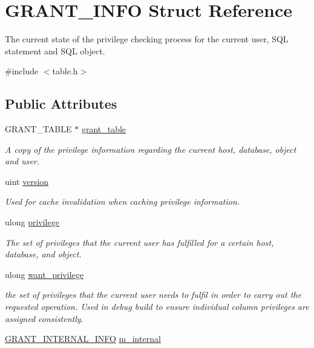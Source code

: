 \hypertarget{structGRANT__INFO}{}\section{G\+R\+A\+N\+T\+\_\+\+I\+N\+FO Struct Reference}
\label{structGRANT__INFO}


The current state of the privilege checking process for the current user, S\+QL statement and S\+QL object.  




{\ttfamily \#include $<$table.\+h$>$}

\subsection*{Public Attributes}
\begin{DoxyCompactItemize}
\item 
G\+R\+A\+N\+T\+\_\+\+T\+A\+B\+LE $\ast$ \mbox{\hyperlink{structGRANT__INFO_a25c6b4e6dd4a135f40d834c233655487}{grant\+\_\+table}}
\begin{DoxyCompactList}\small\item\em A copy of the privilege information regarding the current host, database, object and user. \end{DoxyCompactList}\item 
uint \mbox{\hyperlink{structGRANT__INFO_a9fa219d89f9bbeca61f033a1d75c0ba2}{version}}
\begin{DoxyCompactList}\small\item\em Used for cache invalidation when caching privilege information. \end{DoxyCompactList}\item 
ulong \mbox{\hyperlink{structGRANT__INFO_a5fcbd105724d2b8bc497a3d149795f5e}{privilege}}
\begin{DoxyCompactList}\small\item\em The set of privileges that the current user has fulfilled for a certain host, database, and object. \end{DoxyCompactList}\item 
ulong \mbox{\hyperlink{structGRANT__INFO_afb32946497f7754ba60914d9fca5d616}{want\+\_\+privilege}}
\begin{DoxyCompactList}\small\item\em the set of privileges that the current user needs to fulfil in order to carry out the requested operation. Used in debug build to ensure individual column privileges are assigned consistently. \end{DoxyCompactList}\item 
\mbox{\hyperlink{structst__grant__internal__info}{G\+R\+A\+N\+T\+\_\+\+I\+N\+T\+E\+R\+N\+A\+L\+\_\+\+I\+N\+FO}} \mbox{\hyperlink{structGRANT__INFO_a03c3e3236b3f922a87836a625628a19f}{m\+\_\+internal}}
\end{DoxyCompactItemize}


